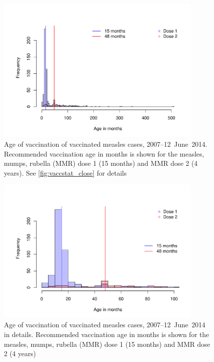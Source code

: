 \documentclass{article}
\begin{document}
\begin{figure}
\begin{center}
     \includegraphics[width=0.9\textwidth]{vacc_age.pdf}
\end{center}
\caption{Age of vaccination of vaccinated measles cases, 2007--12~June~2014. Recommended vaccination age in months is shown for the measles, mumps, rubella (MMR) dose 1 (15 months) and MMR dose 2 (4 years). See \autoref{fig:vaccstat_close} for details}
\label{fig:vaccstat}
\end{figure}

\begin{figure}
\begin{center}
     \includegraphics[width=0.9\textwidth]{vacc_age_close.pdf}
\end{center}
\caption{Age of vaccination of vaccinated measles cases, 2007--12~June~2014 in details. Recommended vaccination age in months is shown for the measles, mumps, rubella (MMR) dose 1 (15 months) and MMR dose 2 (4 years)}
\label{fig:vaccstat_close}
\end{figure}
\end{document}
